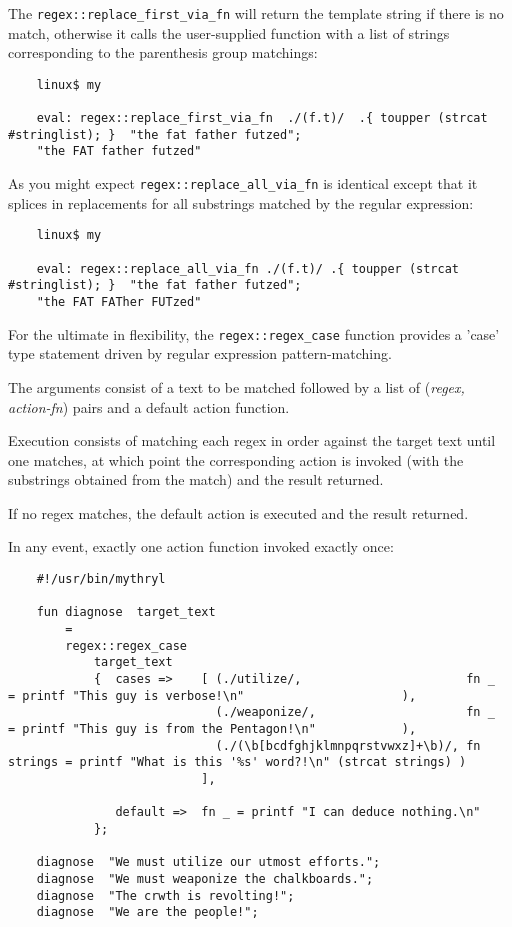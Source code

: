 The {\tt regex::replace\_first\_via\_fn} will return the template string if there is 
no match, otherwise it calls the user-supplied function with 
a list of strings corresponding to the parenthesis group matchings:

\begin{verbatim}
    linux$ my

    eval: regex::replace_first_via_fn  ./(f.t)/  .{ toupper (strcat #stringlist); }  "the fat father futzed";
    "the FAT father futzed"
\end{verbatim}

As you might expect {\tt regex::replace\_all\_via\_fn} is identical except that it splices 
in replacements for all substrings matched by the regular expression:

\begin{verbatim}
    linux$ my

    eval: regex::replace_all_via_fn ./(f.t)/ .{ toupper (strcat #stringlist); }  "the fat father futzed";
    "the FAT FATher FUTzed"
\end{verbatim}



For the ultimate in flexibility, the  
{\tt regex::regex\_case} function provides a 'case' 
type statement driven by regular expression 
pattern-matching.

The arguments consist of a text to be matched 
followed by a list of ({\it regex, action-fn}) pairs 
and a default action function.

Execution consists of matching each regex 
in order against the target text until one matches, 
at which point the corresponding action 
is invoked (with the substrings obtained 
from the match) and the result returned.

If no regex matches, the default action 
is executed and the result returned.

In any event, exactly one action function 
invoked exactly once:

\begin{verbatim}
    #!/usr/bin/mythryl

    fun diagnose  target_text
        =
        regex::regex_case
            target_text
            {  cases =>    [ (./utilize/,                       fn _       = printf "This guy is verbose!\n"                      ),
                             (./weaponize/,                     fn _       = printf "This guy is from the Pentagon!\n"            ),
                             (./(\b[bcdfghjklmnpqrstvwxz]+\b)/, fn strings = printf "What is this '%s' word?!\n" (strcat strings) )
                           ],

               default =>  fn _ = printf "I can deduce nothing.\n"
            };

    diagnose  "We must utilize our utmost efforts.";
    diagnose  "We must weaponize the chalkboards.";
    diagnose  "The crwth is revolting!";
    diagnose  "We are the people!";
\end{verbatim}

